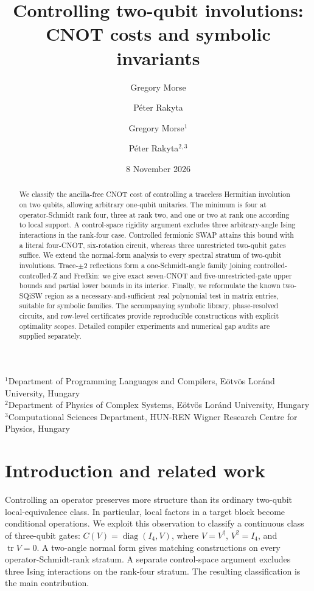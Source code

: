 \documentclass[a4paper,onecolumn,11pt,unpublished]{quantumarticle}
\title{Controlling two-qubit involutions: CNOT costs and symbolic invariants}
\author{Gregory Morse}
\affiliation{Department of Programming Languages and Compilers, E\"otv\"os Lor\'and University, Hungary}
\author{P\'eter Rakyta}
\affiliation{Department of Physics of Complex Systems, E\"otv\"os Lor\'and University, Hungary}
\affiliation{Computational Sciences Department, HUN-REN Wigner Research Centre for Physics, Hungary}
\author{Gregory Morse$^{1}$ \and P\'eter Rakyta$^{2,3}$}
\date{8 November 2026}
\begin{document}
\normalfont
\maketitle
\ifdefined\QuantumSubmission\else
\begin{center}\small
$^1$Department of Programming Languages and Compilers, E\"otv\"os Lor\'and University, Hungary\\
$^2$Department of Physics of Complex Systems, E\"otv\"os Lor\'and University, Hungary\\
$^3$Computational Sciences Department, HUN-REN Wigner Research Centre for Physics, Hungary
\end{center}
\fi
\begin{abstract}
We classify the ancilla-free CNOT cost of controlling a traceless Hermitian
involution on two qubits, allowing arbitrary one-qubit unitaries. The minimum
is four at operator-Schmidt rank four, three at rank two, and one or two at
rank one according to local support. A control-space rigidity argument
excludes three arbitrary-angle Ising interactions in the rank-four case.
Controlled fermionic SWAP attains this bound with a literal four-CNOT,
six-rotation circuit, whereas three unrestricted two-qubit gates suffice.
We extend the normal-form analysis to every spectral stratum of two-qubit
involutions. Trace-\(\pm2\) reflections form a one-Schmidt-angle family
joining controlled-controlled-Z and Fredkin: we give exact seven-CNOT and
five-unrestricted-gate upper bounds and partial lower bounds in its interior.
Finally, we reformulate the known two-SQiSW region as a necessary-and-sufficient
real polynomial test in matrix entries, suitable for symbolic families.
The accompanying symbolic library, phase-resolved circuits, and row-level
certificates provide reproducible constructions with explicit optimality
scopes. Detailed compiler experiments and numerical gap audits are supplied
separately.
\end{abstract}

\section{Introduction and related work}
Controlling an operator preserves more structure than its ordinary two-qubit
local-equivalence class. In particular, local factors in a target block become
conditional operations. We exploit this observation to classify a continuous
class of three-qubit gates: $C(V)=\operatorname{diag}(I_4,V)$, where
$V=V^\dagger$, $V^2=I_4$, and $\operatorname{tr}V=0$. A two-angle normal
form gives matching constructions on every operator-Schmidt-rank stratum.
A separate control-space argument excludes three Ising interactions on the
rank-four stratum. The resulting classification is the main contribution.
\end{document}
